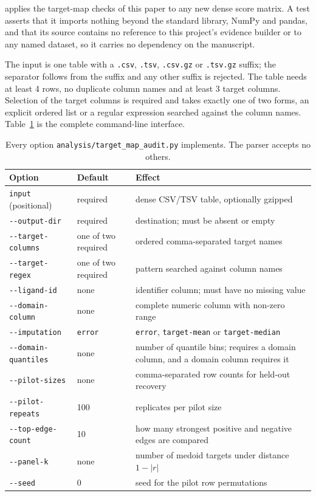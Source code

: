 
 applies the target-map checks of this paper to any new dense
score matrix. A test asserts that it imports nothing beyond the standard library, NumPy and
pandas, and that its source contains no reference to this project's evidence builder or to any
named dataset, so it carries no dependency on the manuscript.

The input is one table with a \texttt{.csv}, \texttt{.tsv}, \texttt{.csv.gz} or \texttt{.tsv.gz}
suffix; the separator follows from the suffix and any other suffix is rejected. The table needs
at least 4 rows, no duplicate column names and at least 3 target columns. Selection of the target
columns is required and takes exactly one of two forms, an explicit ordered list or a regular
expression searched against the column names. Table~\ref{tab:s7cli} is the complete command-line
interface.

\begin{table}[htbp]
\centering
\caption{Every option \texttt{analysis/target\_map\_audit.py} implements. The parser accepts no
others.}
\label{tab:s7cli}
\small
\begin{tabular}{llp{6.6cm}}
\toprule
Option & Default & Effect \\
\midrule
\texttt{input} (positional) & required & dense CSV/TSV table, optionally gzipped \\
\texttt{-{}-output-dir} & required & destination; must be absent or empty \\
\texttt{-{}-target-columns} & one of two required & ordered comma-separated target names \\
\texttt{-{}-target-regex} & one of two required & pattern searched against column names \\
\texttt{-{}-ligand-id} & none & identifier column; must have no missing value \\
\texttt{-{}-domain-column} & none & complete numeric column with non-zero range \\
\texttt{-{}-imputation} & \texttt{error} & \texttt{error}, \texttt{target-mean} or
\texttt{target-median} \\
\texttt{-{}-domain-quantiles} & none & number of quantile bins; requires a domain column, and a
domain column requires it \\
\texttt{-{}-pilot-sizes} & none & comma-separated row counts for held-out recovery \\
\texttt{-{}-pilot-repeats} & 100 & replicates per pilot size \\
\texttt{-{}-top-edge-count} & 10 & how many strongest positive and negative edges are compared \\
\texttt{-{}-panel-k} & none & number of medoid targets under distance $1-|r|$ \\
\texttt{-{}-seed} & 0 & seed for the pilot row permutations \\
\bottomrule
\end{tabular}
\end{table}

